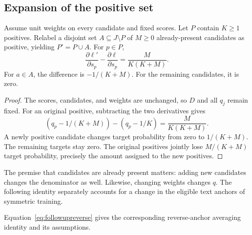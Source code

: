 \subsection{Expansion of the positive set}
\begin{proposition}
Assume unit weights on every candidate and fixed scores. Let $P$ contain $K\geq1$ positives. Relabel a disjoint set $A\subseteq J\setminus P$ of $M\geq0$ already-present candidates as positive, yielding $P'=P\cup A$. For $p\in P$,
\begin{equation}
\frac{\partial\ell'}{\partial s_p}-\frac{\partial\ell}{\partial s_p}=\frac{M}{K(K+M)}.
\end{equation}
For $a\in A$, the difference is $-1/(K+M)$. For the remaining candidates, it is zero.
\end{proposition}
\begin{proof}
The scores, candidates, and weights are unchanged, so $D$ and all $q_j$ remain fixed. For an original positive, subtracting the two derivatives gives
\begin{equation}
(q_p-1/(K+M))-(q_p-1/K)=\frac{M}{K(K+M)}.
\end{equation}
A newly positive candidate changes target probability from zero to $1/(K+M)$. The remaining targets stay zero. The original positives jointly lose $M/(K+M)$ target probability, precisely the amount assigned to the new positives.
\end{proof}
The premise that candidates are already present matters: adding new candidates changes the denominator as well. Likewise, changing weights changes $q$. The following identity separately accounts for a change in the eligible text anchors of symmetric training.

Equation~\ref{eq:followupreverse} gives the corresponding reverse-anchor averaging identity and its assumptions.

